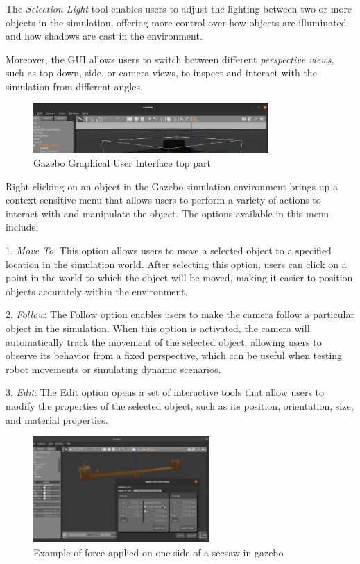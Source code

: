 \documentclass[../../main]{subfiles}
\begin{document}
The \emph{Selection Light} tool enables users to adjust the lighting between 
two or more objects in the simulation, offering more control over how objects are 
illuminated and how shadows are cast in the environment. 

Moreover, the GUI allows users to switch between different \emph{perspective views}, 
such as top-down, side, or camera views, to inspect and interact with the simulation 
from different angles. 

\begin{figure}[H]
    \centering
\includegraphics[width=0.8\textwidth]{fig/gui_top_part.png}
\caption{Gazebo Graphical User Interface top part}
\label{Top part} %
\end{figure}

Right-clicking on an object in the Gazebo simulation environment brings up a context-sensitive 
menu that allows users to perform a variety of actions to interact with and manipulate the object. 
The options available in this menu include:

1. \emph{Move To}: This option allows users to move a selected object to a specified location 
in the simulation world. After selecting this option, users can click on a point in the world to 
which the object will be moved, making it easier to position objects accurately within the 
environment.

2. \emph{Follow}: The Follow option enables users to make the camera follow a particular 
object in the simulation. When this option is activated, the camera will automatically track 
the movement of the selected object, allowing users to observe its behavior from a fixed 
perspective, which can be useful when testing robot movements or simulating dynamic 
scenarios.

3. \emph{Edit}: The Edit option opens a set of interactive tools that allow users to modify 
the properties of the selected object, such as its position, orientation, size, and material 
properties.

\begin{figure}[H]
    \centering
\includegraphics[width=0.6\textwidth]{fig/seesaw_example.png}
\caption{Example of force applied on one side of a seesaw in gazebo}
\label{Seesaw} %
\end{figure}
\end{document}
